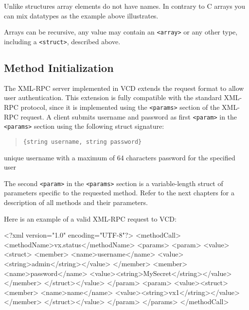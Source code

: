 Unlike structures array elements do not have names. In contrary to C arrays you
can mix datatypes as the example above illustrates.

Arrays can be recursive, any value may contain an \verb,<array>, or any other
type, including a \verb,<struct>,, described above.


\subsection{Method Initialization}

The XML-RPC server implemented in VCD extends the request format to allow user
authentication. This extension is fully compatible with the standard XML-RPC
protocol, since it is implemented using the \verb,<params>, section of the
XML-RPC request. A client submits username and password as first
\verb,<param>, in the \verb,<params>, section using the following struct
signature:

\begin{quote}
\verb|{string username, string password}|
\end{quote}

\begin{labeling}{}
 unique username with a maximum of 64 characters
 password for the specified user
\end{labeling}

The second \verb,<param>, in the \verb,<params>, section is a variable-length
struct of parameters specific to the requested method. Refer to the next
chapters for a description of all methods and their parameters.

Here is an example of a valid XML-RPC request to VCD:

\begin{lstverbatim}
<?xml version="1.0" encoding="UTF-8"?>
<methodCall>
  <methodName>vx.status</methodName>
  <params>
    <param>
      <value><struct>
        <member>
          <name>username</name>
          <value><string>admin</string></value>
        </member>
        <member>
          <name>password</name>
          <value><string>MySecret</string></value>
        </member>
      </struct></value>
    </param>
    <param>
      <value><struct>
        <member>
          <name>name</name>
          <value><string>vx1</string></value>
        </member>
      </struct></value>
    </param>
  </params>
</methodCall>
\end{lstverbatim}

